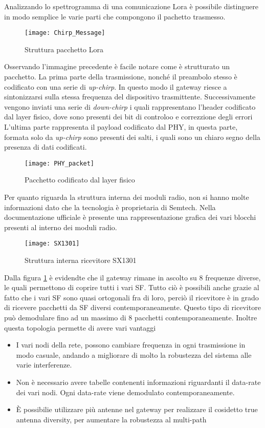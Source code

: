 Analizzando lo spettrogramma di una comunicazione Lora è possibile distinguere
in modo semplice le varie parti che compongono il pachetto trasmesso. 

\begin{figure}[h]
\centering 
\texttt{[image: Chirp\_Message]}
\caption{Struttura pacchetto Lora }
\end{figure}

Osservando l'immagine precedente è facile notare come è strutturato un pacchetto.
La prima parte della trasmissione, nonché il preambolo  stesso è codificato con una
serie di \emph{up-chirp}. In questo modo il gateway riesce a sintonizzarsi sulla
stessa frequenza del dispositivo trasmittente.
Successivamente vengono inviati una serie di
\emph{down-chirp} i quali rappresentano l'header codificato dal layer fisico,
dove sono presenti dei bit di controloo e correzzione degli errori
L'ultima parte rappresenta il payload codificato dal PHY, in questa parte,
formata solo da \emph{up-chirp} sono presenti dei salti, i quali sono un chiaro
segno della presenza di dati codificati.

\begin{figure}[h]
\centering 
\texttt{[image: PHY\_packet]}
\caption{Pacchetto codificato dal layer fisico}
\end{figure}


Per quanto riguarda la struttura interna dei moduli radio, non si hanno molte
informazioni dato che la tecnologia è proprietaria di Semtech. Nella
documentazione ufficiale è presente una rappresentazione grafica dei vari
blocchi presenti al interno dei moduli radio.

\begin{figure}[h]
\centering 
\texttt{[image: SX1301]}
\caption{Struttura interna ricevitore SX1301}
\label{fig:sx1301}
\end{figure}

Dalla figura \ref{fig:sx1301} è evidendte che il gateway rimane in ascolto su 8 
frequenze diverse, le quali permettono di coprire tutti i vari SF. 
Tutto ciò è possibili anche grazie al fatto che i vari SF sono quasi ortogonali 
fra di loro, perciò il ricevitore è in grado di ricevere pacchetti da SF diversi 
contemporaneamente. Questo tipo di ricevitore può demodulare fino ad un massimo 
di 8 pacchetti contemporaneamente. Inoltre questa topologia permette di avere 
vari vantaggi
\begin{itemize}
\item I vari nodi della rete, possono cambiare frequenza in ogni trasmissione in
modo casuale, andando a migliorare di molto la robustezza del sistema alle varie
interferenze.
\item Non è necessario avere tabelle contenenti informazioni riguardanti il
data-rate dei vari nodi. Ogni data-rate viene demodulato contemporaneamente.
\item È possibilie utilizzare più antenne nel gateway per realizzare il
cosidetto true antenna diversity, per aumentare la robustezza al multi-path
\end{itemize}

